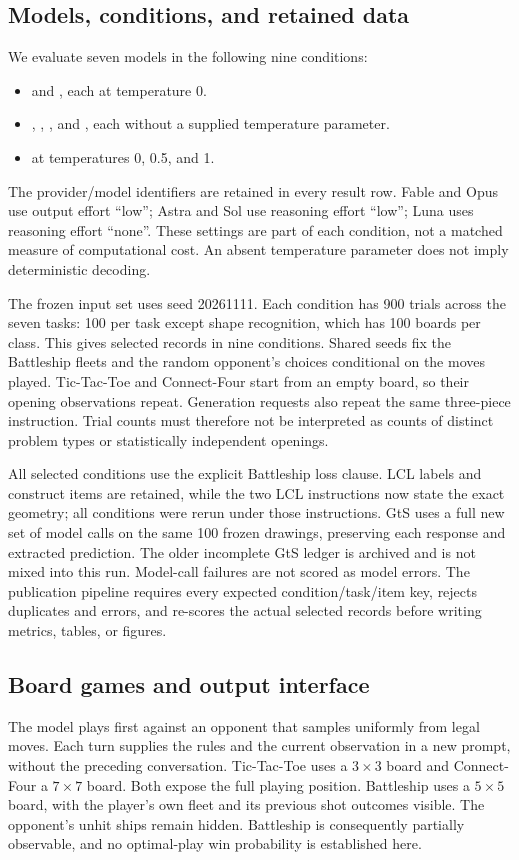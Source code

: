 \documentclass[12pt,letterpaper]{article}
\begin{document}
\subsection*{Models, conditions, and retained data}
We evaluate seven models in the following nine conditions:
\begin{itemize}
\item {} and , each at temperature 0.
\item {}, , , and , each without a supplied temperature parameter.
\item {} at temperatures 0, 0.5, and 1.
\end{itemize}
The provider/model identifiers are retained in every result row. Fable and Opus use output effort ``low''; Astra and Sol use reasoning effort ``low''; Luna uses reasoning effort ``none''. These settings are part of each condition, not a matched measure of computational cost. An absent temperature parameter does not imply deterministic decoding.

The frozen input set uses seed 20261111. Each condition has 900 trials across the seven tasks: 100 per task except shape recognition, which has 100 boards per class. This gives \NumRecords{} selected records in nine conditions. Shared seeds fix the Battleship fleets and the random opponent's choices conditional on the moves played. Tic-Tac-Toe and Connect-Four start from an empty board, so their opening observations repeat. Generation requests also repeat the same three-piece instruction. Trial counts must therefore not be interpreted as counts of distinct problem types or statistically independent openings.

All selected conditions use the explicit Battleship loss clause. LCL labels and construct items are retained, while the two LCL instructions now state the exact geometry; all conditions were rerun under those instructions. GtS uses a full new set of model calls on the same 100 frozen drawings, preserving each response and extracted prediction. The older incomplete GtS ledger is archived and is not mixed into this run. Model-call failures are not scored as model errors. The publication pipeline requires every expected condition/task/item key, rejects duplicates and errors, and re-scores the actual selected records before writing metrics, tables, or figures.

\subsection*{Board games and output interface}
The model plays first against an opponent that samples uniformly from legal moves. Each turn supplies the rules and the current observation in a new prompt, without the preceding conversation. Tic-Tac-Toe uses a $3\times3$ board and Connect-Four a $7\times7$ board. Both expose the full playing position. Battleship uses a $5\times5$ board, with the player's own fleet and its previous shot outcomes visible. The opponent's unhit ships remain hidden. Battleship is consequently partially observable, and no optimal-play win probability is established here.
\end{document}
